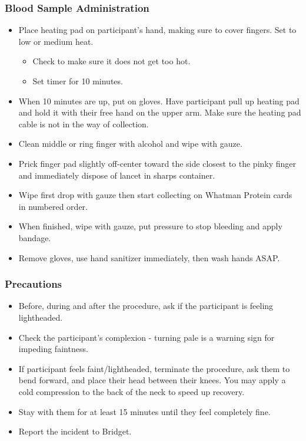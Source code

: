 \documentclass[]{book}
\providecommand{\tightlist}{%
  \setlength{\itemsep}{0pt}\setlength{\parskip}{0pt}}
\begin{document}
\hypertarget{blood-sample-administration}{%
\subsubsection{Blood Sample Administration}\label{blood-sample-administration}}

\begin{itemize}
\tightlist
\item
  Place heating pad on participant's hand, making sure to cover fingers. Set to low or medium heat.

  \begin{itemize}
  \tightlist
  \item
    Check to make sure it does not get too hot.
  \item
    Set timer for 10 minutes.
  \end{itemize}
\item
  When 10 minutes are up, put on gloves. Have participant pull up heating pad and hold it with their free hand on the upper arm. Make sure the heating pad cable is not in the way of collection.
\item
  Clean middle or ring finger with alcohol and wipe with gauze.
\item
  Prick finger pad slightly off-center toward the side closest to the pinky finger and immediately dispose of lancet in sharps container.
\item
  Wipe first drop with gauze then start collecting on Whatman Protein cards in numbered order.
\item
  When finished, wipe with gauze, put pressure to stop bleeding and apply bandage.
\item
  Remove gloves, use hand sanitizer immediately, then wash hands ASAP.
\end{itemize}

\hypertarget{precautions}{%
\subsubsection{Precautions}\label{precautions}}

\begin{itemize}
\tightlist
\item
  Before, during and after the procedure, ask if the participant is feeling lightheaded.
\item
  Check the participant's complexion - turning pale is a warning sign for impeding faintness.
\item
  If participant feels faint/lightheaded, terminate the procedure, ask them to bend forward, and place their head between their knees. You may apply a cold compression to the back of the neck to speed up recovery.
\item
  Stay with them for at least 15 minutes until they feel completely fine.
\item
  Report the incident to Bridget.
\end{itemize}
\end{document}
